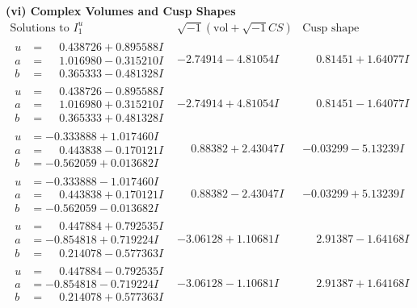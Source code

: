 \documentclass[1p]{elsarticle_modified}
\theoremstyle{definition}
\newcommand{\I}{\sqrt{-1}}
\begin{document}
\newpage\flushleft \textbf{(vi) Complex Volumes and Cusp Shapes}
$$\begin{array}{c|c|c}  
\text{Solutions to }I^u_{1}& \I (\text{vol} + \sqrt{-1}CS) & \text{Cusp shape}\\
 \hline 
\begin{aligned}
u &= \phantom{-}0.438726 + 0.895588 I \\
a &= \phantom{-}1.016980 - 0.315210 I \\
b &= \phantom{-}0.365333 - 0.481328 I\end{aligned}
 & -2.74914 - 4.81054 I & \phantom{-}0.81451 + 1.64077 I \\ \hline\begin{aligned}
u &= \phantom{-}0.438726 - 0.895588 I \\
a &= \phantom{-}1.016980 + 0.315210 I \\
b &= \phantom{-}0.365333 + 0.481328 I\end{aligned}
 & -2.74914 + 4.81054 I & \phantom{-}0.81451 - 1.64077 I \\ \hline\begin{aligned}
u &= -0.333888 + 1.017460 I \\
a &= \phantom{-}0.443838 - 0.170121 I \\
b &= -0.562059 + 0.013682 I\end{aligned}
 & \phantom{-}0.88382 + 2.43047 I & -0.03299 - 5.13239 I \\ \hline\begin{aligned}
u &= -0.333888 - 1.017460 I \\
a &= \phantom{-}0.443838 + 0.170121 I \\
b &= -0.562059 - 0.013682 I\end{aligned}
 & \phantom{-}0.88382 - 2.43047 I & -0.03299 + 5.13239 I \\ \hline\begin{aligned}
u &= \phantom{-}0.447884 + 0.792535 I \\
a &= -0.854818 + 0.719224 I \\
b &= \phantom{-}0.214078 - 0.577363 I\end{aligned}
 & -3.06128 + 1.10681 I & \phantom{-}2.91387 - 1.64168 I \\ \hline\begin{aligned}
u &= \phantom{-}0.447884 - 0.792535 I \\
a &= -0.854818 - 0.719224 I \\
b &= \phantom{-}0.214078 + 0.577363 I\end{aligned}
 & -3.06128 - 1.10681 I & \phantom{-}2.91387 + 1.64168 I \\ \hline\begin{aligned}

\end{aligned}
\end{array}$$
\end{document}
